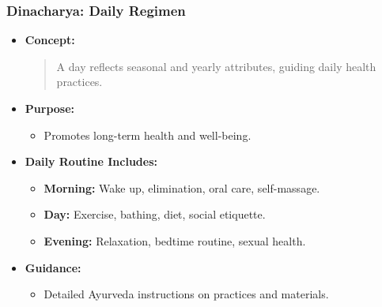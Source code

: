 \begin{frame}[fragile]\frametitle{Dinacharya: Daily Regimen}

      \begin{itemize}
        \item \textbf{Concept:} 
        \begin{quote}
        A day reflects seasonal and yearly attributes, guiding daily health practices.
        \end{quote}
        \item \textbf{Purpose:} 
        \begin{itemize}
            \item Promotes long-term health and well-being.
        \end{itemize}
        \item \textbf{Daily Routine Includes:}
        \begin{itemize}
            \item \textbf{Morning:} Wake up, elimination, oral care, self-massage.
            \item \textbf{Day:} Exercise, bathing, diet, social etiquette.
            \item \textbf{Evening:} Relaxation, bedtime routine, sexual health.
        \end{itemize}
        \item \textbf{Guidance:} 
        \begin{itemize}
            \item Detailed Ayurveda instructions on practices and materials.
        \end{itemize}
      \end{itemize}

\end{frame}

